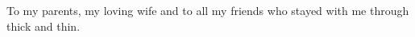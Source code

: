 \vspace{-20 mm}
To my parents, my loving wife and to all my friends who stayed with me through thick and thin.\\
